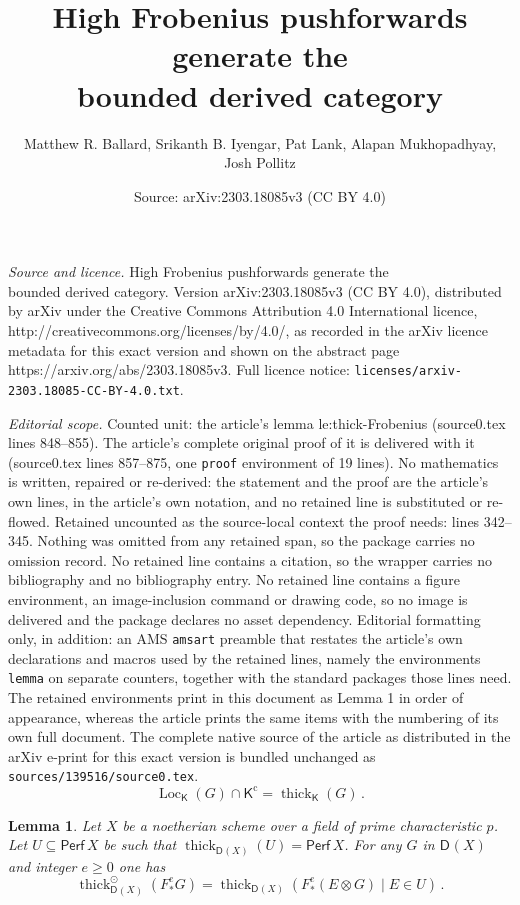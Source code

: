 \documentclass[10pt,a4paper]{amsart}
\title{High Frobenius pushforwards generate the\\ bounded derived category}
\author{Matthew R. Ballard, Srikanth B. Iyengar, Pat Lank, Alapan Mukhopadhyay, Josh Pollitz}
\date{Source: arXiv:2303.18085v3 (CC BY 4.0)}
\newtheorem{lemma}{Lemma}
\newcommand{\Loc}{\operatorname{Loc}}
\newcommand{\cat}[1]{{\mathsf{#1}}}
\newcommand{\dcat}[2][]{\cat{D}_{#1}(#2)}
\newcommand{\perf}[1]{\mathsf{Perf}\,#1}
\newcommand{\thick}{\operatorname{thick}}
\begin{document}
\maketitle

\noindent\emph{Source and licence.} High Frobenius pushforwards generate the\\ bounded derived category. Version arXiv:2303.18085v3 (CC BY 4.0), distributed by arXiv under the Creative Commons Attribution 4.0 International licence, http://creativecommons.org/licenses/by/4.0/, as recorded in the arXiv licence metadata for this exact version and shown on the abstract page https://arxiv.org/abs/2303.18085v3. Full licence notice: \texttt{licenses/arxiv-2303.18085-CC-BY-4.0.txt}.\par\smallskip

\noindent\textit{Editorial scope.} Counted unit: the article's lemma le:thick-Frobenius (source0.tex lines 848--855). The article's complete original proof of it is delivered with it (source0.tex lines 857--875, one \texttt{proof} environment of 19 lines). No mathematics is written, repaired or re-derived: the statement and the proof are the article's own lines, in the article's own notation, and no retained line is substituted or re-flowed.  Retained uncounted as the source-local context the proof needs: lines 342--345.  Nothing was omitted from any retained span, so the package carries no omission record.  No retained line contains a citation, so the wrapper carries no bibliography and no bibliography entry.  No retained line contains a figure environment, an image-inclusion command or drawing code, so no image is delivered and the package declares no asset dependency.  Editorial formatting only, in addition: an AMS \texttt{amsart} preamble that restates the article's own declarations and macros used by the retained lines, namely the environments \texttt{lemma} on separate counters, together with the standard packages those lines need.  The retained environments print in this document as Lemma 1 in order of appearance, whereas the article prints the same items with the numbering of its own full document.  The complete native source of the article as distributed in the arXiv e-print for this exact version is bundled unchanged as \texttt{sources/139516/source0.tex}.
\begin{equation}
\label{eq:neeman-cgt}
\Loc_{\cat K}(G) \cap {\cat K}^{\mathrm c}= \thick_{\cat K}(G)\,.
\end{equation}

\begin{lemma}
\label{le:thick-Frobenius}
Let $X$ be a noetherian scheme over a field of prime characteristic $p$. Let $U\subseteq \perf X$ be such that $\thick_{\dcat X}(U)=\perf X$. For any $G$ in $\dcat X$ and integer $e\ge 0$ one has
\[
\thick^{\odot}_{\dcat X}(F ^e_*G) 
 = \thick_{\dcat X}(F ^e_*(E\otimes G)\mid E\in U)\,.
\]
\end{lemma}
\end{document}
